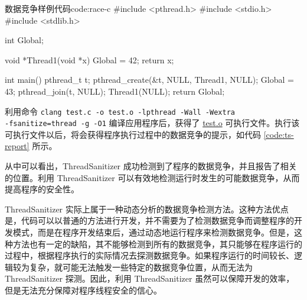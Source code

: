 \documentclass[a4paper, 12pt]{article} %
\newcounter{code}
\numberwithin{equation}{section}
\begin{document}
\begin{code}[c]{数据竞争样例代码}{code:race-c}
  #include <pthread.h>
  #include <stdio.h>
  #include <stdlib.h>
  
  int Global;
  
  void *Thread1(void *x) {
  Global = 42;
  return x;
  }
  
  int main() {
  pthread_t t;
  pthread_create(&t, NULL, Thread1, NULL);
  Global = 43;
  pthread_join(t, NULL);
  Thread1(NULL);
  return Global;
  }  
\end{code}

利用命令 \texttt{clang test.c -o test.o -lpthread -Wall -Wextra \\-fsanitize=thread -g -O1} 编译应用程序后，获得了 \url{test.o} 可执行文件。执行该可执行文件以后，将会获得程序执行过程中的数据竞争的提示，如代码 \ref{code:ts-report} 所示。


从中可以看出，ThreadSanitizer 成功检测到了程序的数据竞争，并且报告了相关的位置。利用 ThreadSanitizer 可以有效地检测运行时发生的可能数据竞争，从而提高程序的安全性。

ThreadSanitizer 实际上属于一种动态分析的数据竞争检测方法。这种方法优点是，代码可以以普通的方法进行开发，并不需要为了检测数据竞争而调整程序的开发模式，而是在程序开发结束后，通过动态地运行程序来检测数据竞争。但是，这种方法也有一定的缺陷，其不能够检测到所有的数据竞争，其只能够在程序运行的过程中，根据程序执行的实际情况去探测数据竞争。如果程序运行的时间较长、逻辑较为复杂，就可能无法触发一些特定的数据竞争位置，从而无法为 ThreadSanitizer 探测。因此，利用 ThreadSanitizer 虽然可以保障开发的效率，但是无法充分保障对程序线程安全的信心。
\end{document}

